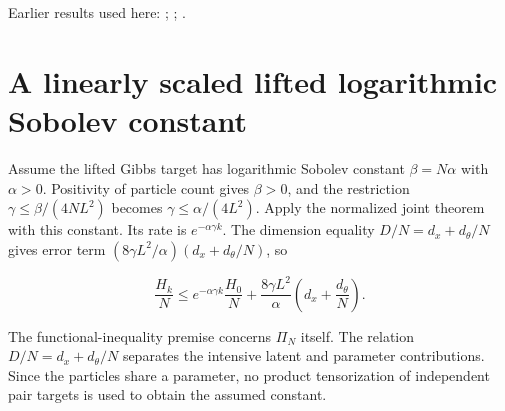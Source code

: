 \documentclass[11pt,a4paper]{article}
\begin{document}
Earlier results used here: \cite[Section~3.1.3]{LangevinLean2026ULALSI}; \cite[Section~3.1.1]{LangevinLean2026IPLA}; \cite[Section~3.3.2]{LangevinLean2026IPLA}.

\section{\texorpdfstring{A linearly scaled lifted logarithmic Sobolev constant}{A linearly scaled lifted logarithmic Sobolev constant}}


Assume the lifted Gibbs target has logarithmic Sobolev constant \(\beta=N\alpha\) with \(\alpha>0\). Positivity of particle count gives \(\beta>0\), and the restriction \(\gamma\le\beta/(4NL^2)\) becomes \(\gamma\le\alpha/(4L^2)\). Apply the normalized joint theorem with this constant. Its rate is \(e^{-\alpha\gamma k}\). The dimension equality \(D/N=d_x+d_\theta/N\) gives error term \((8\gamma L^2/\alpha)(d_x+d_\theta/N)\), so

\[\frac{H_k}{N}\le e^{-\alpha\gamma k}\frac{H_0}{N}+\frac{8\gamma L^2}{\alpha}\left(d_x+\frac{d_\theta}{N}\right).\]

The functional-inequality premise concerns \(\Pi_N\) itself. The relation \(D/N=d_x+d_\theta/N\) separates the intensive latent and parameter contributions. Since the particles share a parameter, no product tensorization of independent pair targets is used to obtain the assumed constant.
\end{document}
